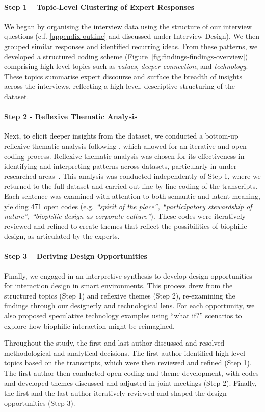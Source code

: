 \paragraph{Step 1 – Topic-Level Clustering of Expert Responses}
We began by organising the interview data using the structure of our interview questions (c.f. \autoref{appendix-outline} and discussed under Interview Design). We then grouped similar responses and identified recurring ideas. From these patterns, we developed a structured coding scheme (Figure~\ref{fig:findings-findings-overview}) comprising high-level topics such as \textit{values}, \textit{deeper connection}, and \textit{technology}. These topics summarise expert discourse and surface the breadth of insights across the interviews, reflecting a high-level, descriptive structuring of the dataset.


\paragraph{Step 2 - Reflexive Thematic Analysis}
Next, to elicit deeper insights from the dataset, we conducted a bottom-up reflexive thematic analysis following \citet{braun2023thematic, byrne2021worked}, which allowed for an iterative and open coding process. Reflexive thematic analysis was chosen for its effectiveness in identifying and interpreting patterns across datasets, particularly in under-researched areas~\cite{clarke2013successful, braun2013shouldn}. This analysis was conducted independently of Step 1, where we returned to the full dataset and carried out line-by-line coding of the transcripts. Each sentence was examined with attention to both semantic and latent meaning, yielding $471$ open codes (e.g. \textit{``spirit of the place'', ``participatory stewardship of nature'', ``biophilic design as corporate culture''}). These codes were iteratively reviewed and refined to create themes that reflect the possibilities of biophilic design, as articulated by the experts. 

\paragraph{Step 3 – Deriving Design Opportunities}
Finally, we engaged in an interpretive synthesis to develop design opportunities for interaction design in smart environments. This process drew from the structured topics (Step 1) and reflexive themes (Step 2), re-examining the findings through our designerly and technological lens. For each opportunity, we also proposed speculative technology examples using “what if?” scenarios to explore how biophilic interaction might be reimagined.

Throughout the study, the first and last author discussed and resolved methodological and analytical decisions. The first author identified high-level topics based on the transcripts, which were then reviewed and refined (Step 1). The first author then conducted open coding and theme development, with codes and developed themes discussed and adjusted in joint meetings (Step 2). Finally, the first and the last author iteratively reviewed and shaped the design opportunities (Step 3). 





